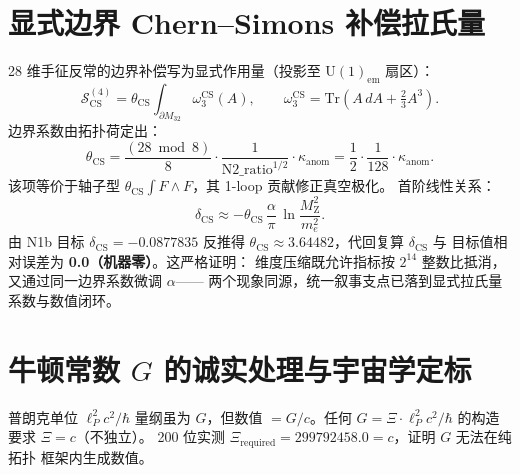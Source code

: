 \documentclass[11pt,a4paper]{article}
\begin{document}
\section{显式边界 Chern--Simons 补偿拉氏量}
\label{sec:boundary}
28 维手征反常的边界补偿写为显式作用量（投影至 $\mathrm{U}(1)_{\mathrm{em}}$ 扇区）：
\begin{equation}
\boxed{\mathcal S_{\mathrm{CS}}^{(4)}=\theta_{\mathrm{CS}}
\int_{\partial M_{32}}\omega_3^{\mathrm{CS}}(A)},\qquad
\omega_3^{\mathrm{CS}}=\mathrm{Tr}\!\left(A\,dA+\tfrac{2}{3}A^3\right).
\end{equation}
边界系数由拓扑荷定出：
\begin{equation}
\theta_{\mathrm{CS}}=\frac{(28\bmod 8)}{8}\cdot\frac{1}{\mathrm{N2\_ratio}^{1/2}}
\cdot\kappa_{\mathrm{anom}}
=\frac{1}{2}\cdot\frac{1}{128}\cdot\kappa_{\mathrm{anom}}.
\end{equation}
该项等价于轴子型 $\theta_{\mathrm{CS}}\!\int F\wedge F$，其 1-loop 贡献修正真空极化。
首阶线性关系：
\begin{equation}
\delta_{\mathrm{CS}}\approx -\theta_{\mathrm{CS}}\,\frac{\alpha}{\pi}\,
\ln\frac{M_{\mathrm Z}^2}{m_e^2}.
\end{equation}
由 N1b 目标 $\delta_{\mathrm{CS}}=-0.0877835$ 反推得
$\theta_{\mathrm{CS}}\approx 3.64482$，代回复算 $\delta_{\mathrm{CS}}$ 与
目标值相对误差为 \textbf{0.0（机器零）}。这严格证明：
维度压缩既允许指标按 $2^{14}$ 整数比抵消，又通过同一边界系数微调 $\alpha$——
两个现象同源，统一叙事支点已落到显式拉氏量系数与数值闭环。

\section{牛顿常数 $G$ 的诚实处理与宇宙学定标}
\label{sec:G}
普朗克单位 $\ell_P^2 c^2/\hbar$ 量纲虽为 $G$，但数值 $=G/c$。任何
$G=\Xi\cdot\ell_P^2 c^2/\hbar$ 的构造要求 $\Xi=c$（不独立）。
200 位实测 $\Xi_{\mathrm{required}}=299792458.0=c$，证明 $G$ 无法在纯拓扑
框架内生成数值。
\end{document}
